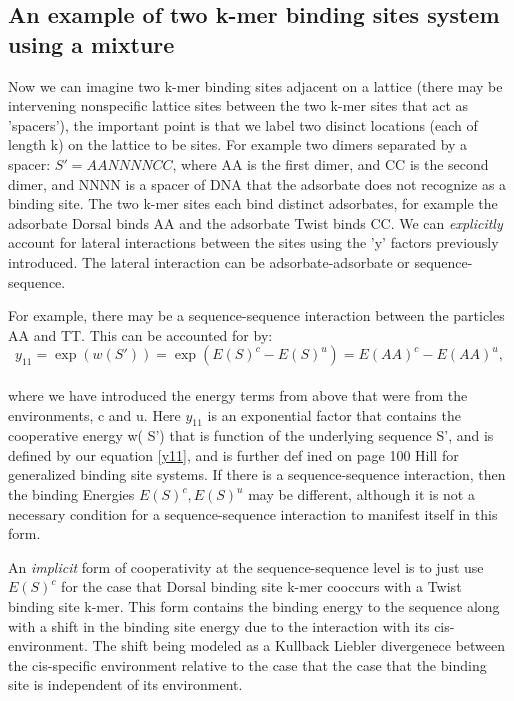 \subsection*{An example of two k-mer binding sites system using a mixture}
Now we can imagine two k-mer binding sites adjacent on a lattice (there may be intervening nonspecific lattice sites between the two k-mer sites that act as 'spacers'), the important point is that we label two disinct locations (each of length k) on the lattice to be sites.  For example two dimers separated by a spacer: $S'= AANNNNCC$, where AA is the first dimer, and CC is the second dimer, and NNNN is a spacer of DNA that the adsorbate does not recognize as a binding site.  The two k-mer sites each bind distinct adsorbates, for example the adsorbate Dorsal binds AA and the adsorbate Twist binds CC.  We can \textit{explicitly} account for lateral interactions between the sites using the 'y' factors previously introduced.  The lateral interaction can be adsorbate-adsorbate or sequence-sequence.

For example, there may be a sequence-sequence interaction between the particles AA and TT.  This can be accounted for by:
\begin{equation}\label{}
  y_{11} =\exp( w(S') ) = \exp( E(S)^c - E(S)^u )= E(AA)^c-E(AA)^u,
\end{equation}
\\
where we have introduced the energy terms from above that were from the environments, c and u. Here $y_{11}$ is an exponential factor that contains the cooperative energy w(
S') that is function of the underlying sequence S', and is defined by our equation \eqref{y11}, and is further def
ined on page 100 Hill for generalized binding site systems.  If there is a sequence-sequence interaction, then the binding Energies $E(S)^c, E(S)^u$ may be different, although it is not a necessary condition for a sequence-sequence interaction to manifest itself in this form.

An \textit{implicit} form of cooperativity at the sequence-sequence level is to just use $E(S)^c$ for the case that Dorsal binding site k-mer cooccurs with a Twist binding site k-mer.  This form contains the binding energy to the sequence along with a shift in the binding site energy due to the interaction with its cis-environment.  The shift being modeled as a Kullback Liebler divergenece between the cis-specific environment relative to the case that the case that the binding site is independent of its environment.
